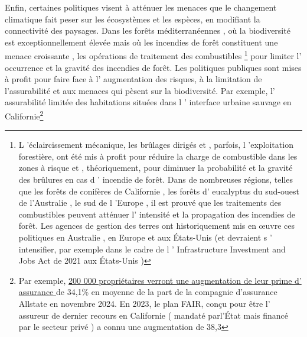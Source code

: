\begin{displayquote}
\begin{displayquote}
\begin{displayquote}
{{Enfin, certaines politiques visent à atténuer les menaces que le changement climatique fait peser sur les écosystèmes et les espèces, en modifiant la connectivité des paysages. Dans les forêts méditerranéennes , où la biodiversité est exceptionnellement élevée mais où les incendies de forêt constituent une menace croissante \citep{Dupuy2019ClimateCI, wasserman_climate_2023}, les opérations de traitement des combustibles \footnote{L 'éclaircissement mécanique, les brûlages dirigés et , parfois, l 'exploitation forestière, ont été mis à profit pour réduire la charge de combustible dans les zones à risque et , théoriquement, pour diminuer la probabilité et la gravité des brûlures en cas d ' incendie de forêt. Dans de nombreuses régions, telles que les forêts de conifères de Californie \citep{Vaillant2009, Kalies2016, low_shaded_2023}, les forêts d' eucalyptus du sud-ouest de l'Australie \citep{burrows2013, boer_long-term_2009, Florec2020}, le sud de l 'Europe \citep{Fernandes2013}, il est prouvé que les traitements des combustibles peuvent atténuer l' intensité et la propagation des incendies de forêt.   Les agences de gestion des terres ont historiquement mis en œuvre ces politiques en Australie \citep{burrows2013}, en Europe et aux États-Unis (et devraient s ' intensifier, par exemple dans le cadre de l ' Infrastructure Investment and Jobs Act de 2021 aux États-Unis )} pour limiter l' occurrence et la gravité des incendies de forêt.   Les politiques publiques sont mises à profit pour faire face à l' augmentation des risques, à la limitation de l'assurabilité et aux menaces qui pèsent sur la biodiversité. Par exemple, l' assurabilité limitée des habitations situées dans l ' interface urbaine sauvage en Californie\footnote{Par exemple, \href{https://www.washingtonpost.com/climate-environment/2024/08/29/california-insurance-wildfires-allstate/}{200 000 propriétaires verront une augmentation de leur prime d' assurance } de 34,1\% en moyenne de la part de la compagnie d'assurance Allstate en novembre 2024. En 2023, le plan FAIR, conçu pour être l' assureur de dernier recours en Californie ( mandaté parl'État mais financé par le secteur privé ) a connu une augmentation de 38,3 %

}}}
\end{displayquote}
\end{displayquote}
\end{displayquote}
